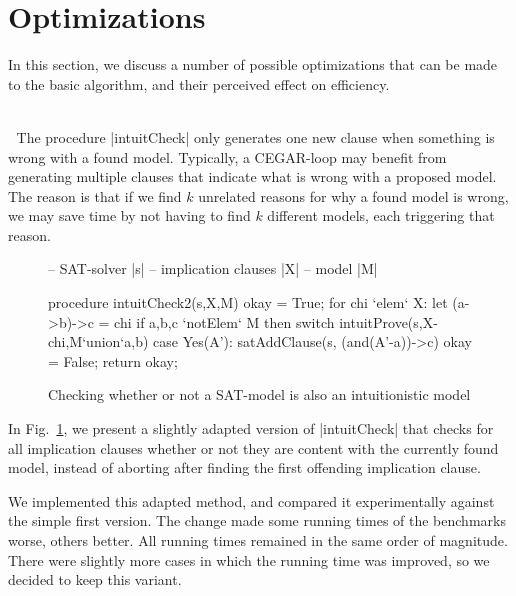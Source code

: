 \documentclass{llncs}
\begin{document}

\section{Optimizations}

In this section, we discuss a number of possible optimizations that can be made to the basic algorithm, and their perceived effect on efficiency.

~\\ $\;$ The procedure |intuitCheck| only generates one new clause when something is wrong with a found model. Typically, a CEGAR-loop may benefit from generating multiple clauses that indicate what is wrong with a proposed model. The reason is that if we find $k$ unrelated reasons for why a found model is wrong, we may save time by not having to find $k$ different models, each triggering that reason.

\begin{figure}[t]
\begin{center}
\begin{code}
-- SAT-solver |s|
-- implication clauses |X|
-- model |M|

procedure intuitCheck2(s,X,M)
  okay = True;
  for chi `elem` X:
    let (a->b)->c = chi
    if a,b,c `notElem` M then
      switch intuitProve(s,X-{chi},M`union`{a},b)
        case Yes(A'):
          satAddClause(s, (and(A'-{a}))->c)
          okay = False;
  return okay;
\end{code}
\vspace{-0.7cm}\end{center}
\caption{Checking whether or not a SAT-model is also an intuitionistic model}
\label{fig:check2}
\end{figure}

In Fig.\ \ref{fig:check2}, we present a slightly adapted version of |intuitCheck| that checks for all implication clauses whether or not they are content with the currently found model, instead of aborting after finding the first offending implication clause.

We implemented this adapted method, and compared it experimentally against the simple first version. The change made some running times of the benchmarks worse, others better. All running times remained in the same order of magnitude. There were slightly more cases in which the running time was improved, so we decided to keep this variant.
\end{document}
